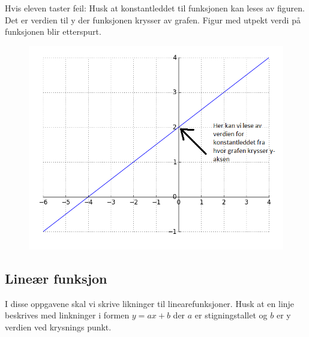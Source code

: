 \documentclass[12pt,twoside,onecolumn]{article}
\begin{document}
\begin{Exercise}
{\color{Maroon}Hvis eleven taster feil: Husk at konstantleddet til funksjonen kan leses av figuren. Det er verdien til y der funksjonen krysser av grafen.}
{\color{Maroon}Figur med utpekt verdi på funksjonen blir etterspurt.}
\begin{figure}[h!]
\centering
\includegraphics[scale = 0.6]{figures/konstantleddeksempelet.png}
\end{figure}
\end{Exercise}

\subsection*{Lineær funksjon}
I disse oppgavene  skal vi skrive likninger til linearefunksjoner. Husk at en linje beskrives med linkninger i formen $y=ax+b$ der $a$ er stigningstallet og $b$ er y verdien ved krysnings punkt.
\end{document}
